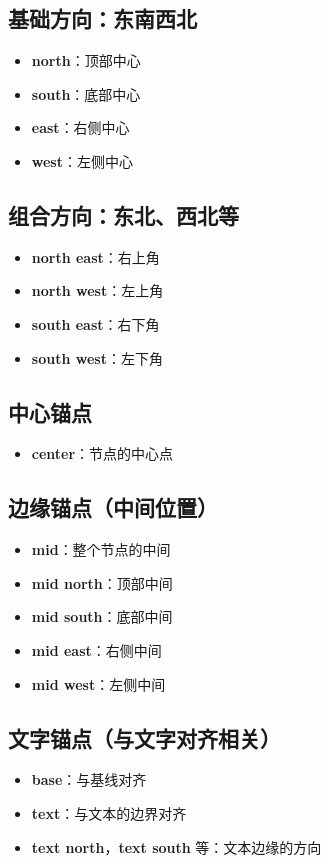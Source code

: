 \documentclass[14pt,a4paper,UTF8,twoside]{article}
\begin{document}
\begin{multicols}{3}
\subsection*{基础方向：东南西北}
\begin{itemize}
    \item \textbf{north}：顶部中心
    \item \textbf{south}：底部中心
    \item \textbf{east}：右侧中心
    \item \textbf{west}：左侧中心
\end{itemize}

\subsection*{组合方向：东北、西北等}
\begin{itemize}
    \item \textbf{north east}：右上角
    \item \textbf{north west}：左上角
    \item \textbf{south east}：右下角
    \item \textbf{south west}：左下角
\end{itemize}

\columnbreak

\subsection*{中心锚点}
\begin{itemize}
    \item \textbf{center}：节点的中心点
\end{itemize}

\subsection*{边缘锚点（中间位置）}
\begin{itemize}
    \item \textbf{mid}：整个节点的中间
    \item \textbf{mid north}：顶部中间
    \item \textbf{mid south}：底部中间
    \item \textbf{mid east}：右侧中间
    \item \textbf{mid west}：左侧中间
\end{itemize}

\subsection*{文字锚点（与文字对齐相关）}
\begin{itemize}
    \item \textbf{base}：与基线对齐
    \item \textbf{text}：与文本的边界对齐
    \item \textbf{text north}，\textbf{text south} 等：文本边缘的方向
\end{itemize}

\end{multicols}
\end{document}
